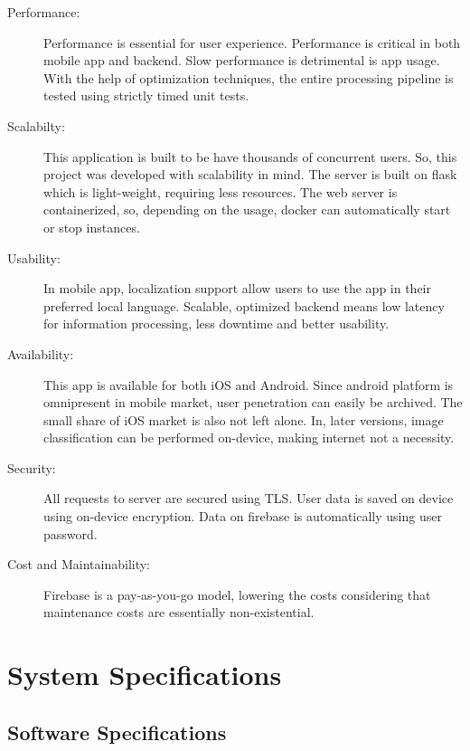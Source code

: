 \documentclass[../Report.tex]{subfiles}
\begin{document}
\begin{description}
  \item[Performance:] Performance is essential for user experience. Performance is critical in both mobile app and backend. Slow performance 
  is detrimental is app usage. With the help of optimization techniques, the entire processing pipeline is tested using strictly timed 
  unit tests.
  
  \item[Scalabilty:] This application is built to be have thousands of concurrent users. So, this project was developed with scalability in 
  mind. The server is built on flask which is light-weight, requiring less resources. The web server is containerized, so, depending on the 
  usage, docker can automatically start or stop instances.

  \item[Usability:] In mobile app, localization support allow users to use the app in their preferred local language. Scalable, optimized 
  backend means low latency for information processing, less downtime and better usability.

  \item[Availability:] This app is available for both iOS and Android. Since android platform is omnipresent in mobile market, user 
  penetration can easily be archived. The small share of iOS market is also not left alone. In, later versions, image classification
  can be performed on-device, making internet not a necessity.

  \item[Security:] All requests to server are secured using TLS. User data is saved on device using on-device encryption. Data on 
  firebase is automatically using user password.

  \item[Cost and Maintainability: ] Firebase is a pay-as-you-go model, lowering the costs considering that maintenance costs are 
  essentially non-existential.
\end{description} 

\section{System Specifications}

\subsection{Software Specifications}
\end{document}

